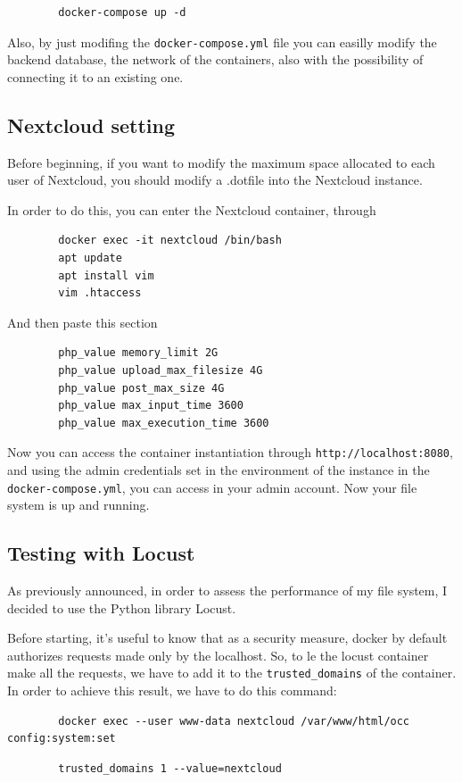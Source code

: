 \documentclass{article}
\begin{document}
	\begin{verbatim}
		docker-compose up -d
	\end{verbatim}
	
	Also, by just modifing the \verb|docker-compose.yml| file you can easilly modify the backend database, the network of the containers, also with the possibility of connecting it to an existing one.
	
	\subsection{Nextcloud setting}
	Before beginning, if you want to modify the maximum space allocated to each user of Nextcloud, you should modify a .dotfile into the Nextcloud instance.
	
	In order to do this, you can enter the Nextcloud container, through
	\begin{verbatim}
		docker exec -it nextcloud /bin/bash
		apt update
		apt install vim
		vim .htaccess
	\end{verbatim}
	And then paste this section
	\begin{verbatim}
		php_value memory_limit 2G
		php_value upload_max_filesize 4G
		php_value post_max_size 4G
		php_value max_input_time 3600
		php_value max_execution_time 3600
	\end{verbatim}
	
	Now you can access the container instantiation through \verb|http://localhost:8080|, and using the admin credentials set in the environment of the instance in the \verb|docker-compose.yml|, you can access in your admin account.
	Now your file system is up and running.
	
	\subsection{Testing with Locust}
	As previously announced, in order to assess the performance of my file system, I decided to use the Python library Locust.
	
	Before starting, it's useful to know that as a security measure, docker by default authorizes requests made only by the localhost. So, to le the locust container make all the requests, we have to add it to the \verb|trusted_domains| of the container. In order to achieve this result, we have to do this command:
	\begin{verbatim}
		docker exec --user www-data nextcloud /var/www/html/occ config:system:set
	\end{verbatim}
	\begin{verbatim}
		trusted_domains 1 --value=nextcloud
	\end{verbatim}
	
\end{document}
